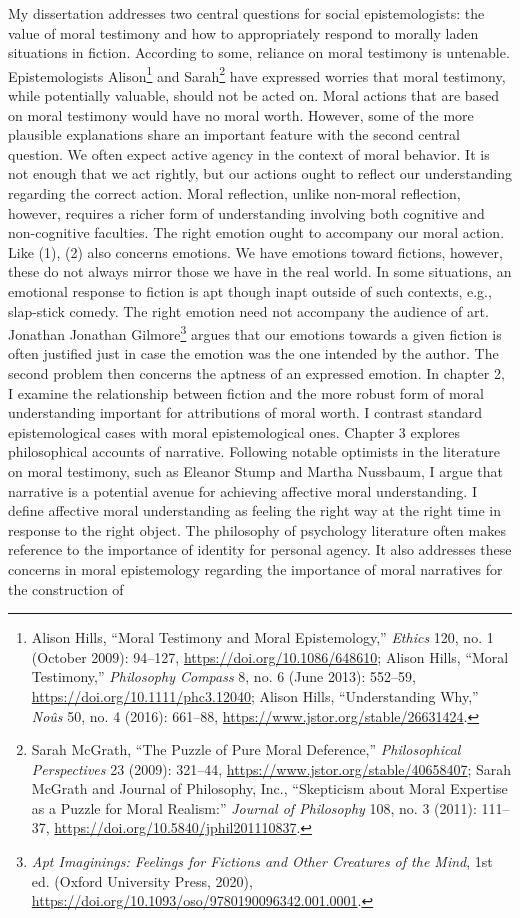 \documentclass[phdthesis,12pt,final]{wuthesis}
\theoremstyle{definition}
\theoremstyle{definition}
\theoremstyle{definition}
\theoremstyle{definition}
\theoremstyle{remark}
\begin{document}
My dissertation addresses two central questions for social epistemologists: the value of moral testimony and how to appropriately respond to morally laden situations in fiction. According to some, reliance on moral testimony is untenable. Epistemologists Alison\footnote{Alison Hills, {``Moral Testimony and Moral Epistemology,''} \emph{Ethics} 120, no. 1 (October 2009): 94--127, \url{https://doi.org/10.1086/648610}; Alison Hills, {``Moral {Testimony},''} \emph{Philosophy Compass} 8, no. 6 (June 2013): 552--59, \url{https://doi.org/10.1111/phc3.12040}; Alison Hills, {``Understanding {Why},''} \emph{Noûs} 50, no. 4 (2016): 661--88, \url{https://www.jstor.org/stable/26631424}.} and Sarah\footnote{Sarah McGrath, {``The {Puzzle} of {Pure Moral Deference},''} \emph{Philosophical Perspectives} 23 (2009): 321--44, \url{https://www.jstor.org/stable/40658407}; Sarah McGrath and Journal of Philosophy, Inc., {``Skepticism about {Moral Expertise} as a {Puzzle} for {Moral Realism}:''} \emph{Journal of Philosophy} 108, no. 3 (2011): 111--37, \url{https://doi.org/10.5840/jphil201110837}.} have expressed worries that moral testimony, while potentially valuable, should not be acted on. Moral actions that are based on moral testimony would have no moral worth. However, some of the more plausible explanations share an important feature with the second central question. We often expect active agency in the context of moral behavior. It is not enough that we act rightly, but our actions ought to reflect our understanding regarding the correct action. Moral reflection, unlike non-moral reflection, however, requires a richer form of understanding involving both cognitive and non-cognitive faculties. The right emotion ought to accompany our moral action. Like (1), (2) also concerns emotions. We have emotions toward fictions, however, these do not always mirror those we have in the real world. In some situations, an emotional response to fiction is apt though inapt outside of such contexts, e.g., slap-stick comedy. The right emotion need not accompany the audience of art. Jonathan Jonathan Gilmore\footnote{\emph{Apt {Imaginings}: {Feelings} for {Fictions} and {Other Creatures} of the {Mind}}, 1st ed. (Oxford University Press, 2020), \url{https://doi.org/10.1093/oso/9780190096342.001.0001}.} argues that our emotions towards a given fiction is often justified just in case the emotion was the one intended by the author. The second problem then concerns the aptness of an expressed emotion. In chapter 2, I examine the relationship between fiction and the more robust form of moral understanding important for attributions of moral worth. I contrast standard epistemological cases with moral epistemological ones. Chapter 3 explores philosophical accounts of narrative. Following notable optimists in the literature on moral testimony, such as Eleanor Stump and Martha Nussbaum, I argue that narrative is a potential avenue for achieving affective moral understanding. I define affective moral understanding as feeling the right way at the right time in response to the right object. The philosophy of psychology literature often makes reference to the importance of identity for personal agency. It also addresses these concerns in moral epistemology regarding the importance of moral narratives for the construction of 
\end{document}
